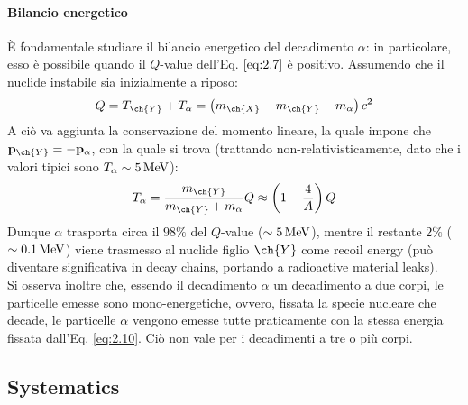 \paragraph{Bilancio energetico}

È fondamentale studiare il bilancio energetico del decadimento $ \alpha $: in particolare, esso è possibile quando il $ Q $-value dell'Eq. $ \ref{eq:2.7} $ è positivo. Assumendo che il nuclide instabile sia inizialmente a riposo:
\begin{equation}
	Q = T_{\ch{Y}} + T_{\alpha} = \left( m_{\ch{X}} - m_{\ch{Y}} - m_{\alpha} \right) c^2
	\label{eq:2.9}
\end{equation}
A ciò va aggiunta la conservazione del momento lineare, la quale impone che $ \ve{p}_{\ch{Y}} = -\ve{p}_{\alpha} $, con la quale si trova (trattando non-relativisticamente, dato che i valori tipici sono $ T_{\alpha} \sim 5\,\mathrm{MeV} $):
\begin{equation}
	T_{\alpha} = \frac{m_{\ch{Y}}}{m_{\ch{Y}} + m_{\alpha}} Q \approx \left( 1 - \frac{4}{A} \right) Q
	\label{eq:2.10}
\end{equation}
Dunque $ \alpha $ trasporta circa il $ 98\% $ del $ Q $-value ($ \sim 5\,\mathrm{MeV} $), mentre il restante $ 2\% $ ($ \sim 0.1\,\mathrm{MeV} $) viene trasmesso al nuclide figlio $ \ch{Y} $ come recoil energy (può diventare significativa in decay chains, portando a radioactive material leaks).\\
Si osserva inoltre che, essendo il decadimento $ \alpha $ un decadimento a due corpi, le particelle emesse sono mono-energetiche, ovvero, fissata la specie nucleare che decade, le particelle $ \alpha $ vengono emesse tutte praticamente con la stessa energia fissata dall'Eq. \ref{eq:2.10}. Ciò non vale per i decadimenti a tre o più corpi.

\subsection{Systematics}


